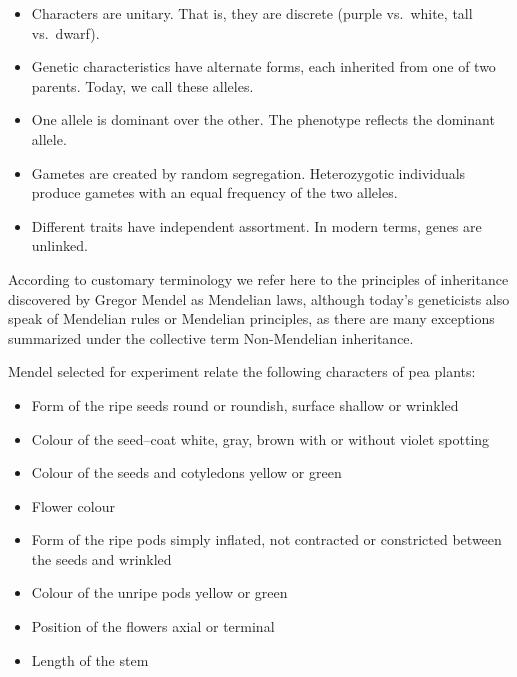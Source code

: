 \begin{itemize}
\tightlist
\item
  Characters are unitary. That is, they are discrete (purple vs.~white, tall vs.~dwarf).
\item
  Genetic characteristics have alternate forms, each inherited from one of two parents. Today, we call these alleles.
\item
  One allele is dominant over the other. The phenotype reflects the dominant allele.
\item
  Gametes are created by random segregation. Heterozygotic individuals produce gametes with an equal frequency of the two alleles.
\item
  Different traits have independent assortment. In modern terms, genes are unlinked.
\end{itemize}

According to customary terminology we refer here to the principles of inheritance discovered by Gregor Mendel as Mendelian laws, although today's geneticists also speak of Mendelian rules or Mendelian principles, as there are many exceptions summarized under the collective term Non-Mendelian inheritance.

Mendel selected for experiment relate the following characters of pea plants:

\begin{itemize}
\tightlist
\item
  Form of the ripe seeds round or roundish, surface shallow or wrinkled
\item
  Colour of the seed--coat white, gray, brown with or without violet spotting
\item
  Colour of the seeds and cotyledons yellow or green
\item
  Flower colour
\item
  Form of the ripe pods simply inflated, not contracted or constricted between the seeds and wrinkled
\item
  Colour of the unripe pods yellow or green
\item
  Position of the flowers axial or terminal
\item
  Length of the stem
\end{itemize}



